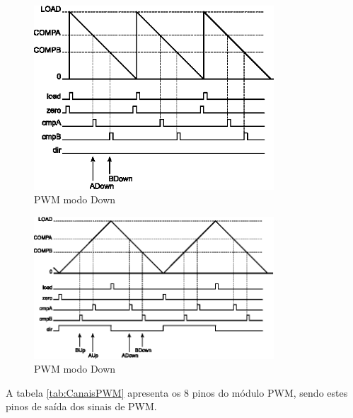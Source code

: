 \begin{figure}[H]
	\centering
	\includegraphics[width=0.8\textwidth] {figuras/PWMCountDownMode.eps}
	\caption{PWM modo Down \cite{DATASHEET_TIVA}}
	\label{fig:PWMCountDownMode}
\end{figure}

\begin{figure}[H]
	\centering
	\includegraphics[width=0.8\textwidth] {figuras/PWMCountUpDownMode.eps}
	\caption{PWM modo Down \cite{DATASHEET_TIVA}}
	\label{fig:PWMCountUpDownMode}
\end{figure}

A tabela \ref{tab:CanaisPWM} apresenta os 8 pinos do módulo PWM, sendo estes pinos de saída dos sinais de PWM.  

